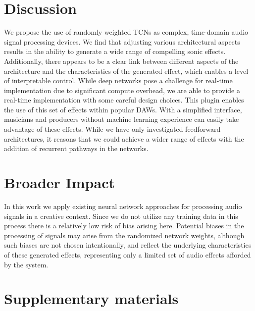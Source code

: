 \documentclass{article}
\begin{document}
\section{Discussion}

We propose the use of randomly weighted TCNs as complex, time-domain audio signal processing devices. 
We find that adjusting various architectural aspects results in the ability to generate a wide range of compelling sonic effects.
Additionally, there appears to be a clear link between different aspects of the architecture and the characteristics of the generated effect, 
which enables a level of interpretable control. 
While deep networks pose a challenge for real-time implementation due to significant compute overhead, 
we are able to provide a real-time implementation with some careful design choices. 
This plugin enables the use of this set of effects within popular DAWs. 
With a simplified interface, musicians and producers without machine learning experience can easily take advantage of these effects.
While we have only investigated feedforward architectures, 
it reasons that we could achieve a wider range of effects with the addition of recurrent pathways in the networks.

\section*{Broader Impact}
In this work we apply existing neural network approaches for processing audio signals in a creative context.
Since we do not utilize any training data in this process there is a relatively low risk of bias arising here. 
Potential biases in the processing of signals may arise from the randomized network weights,
although such biases are not chosen intentionally, and reflect the underlying characteristics of these generated effects,
representing only a limited set of audio effects afforded by the system.

{}


\newpage
\section*{Supplementary materials}
\end{document}
